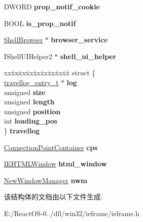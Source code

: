 \begin{DoxyCompactItemize}
D\+W\+O\+RD {\bfseries prop\+\_\+notif\+\_\+cookie}
\item 
\mbox{\label{struct_doc_host_a7151d73ed8dcb7289ea51bfe697f848d}} 
B\+O\+OL {\bfseries is\+\_\+prop\+\_\+notif}
\item 
\mbox{\label{struct_doc_host_aedd623a3c1b02c438ac7c55a15bc8395}} 
\hyperlink{struct_shell_browser}{Shell\+Browser} $\ast$ {\bfseries browser\+\_\+service}
\item 
\mbox{\label{struct_doc_host_a08bccca6d796efd84eb3bb116bff5724}} 
I\+Shell\+U\+I\+Helper2 $\ast$ {\bfseries shell\+\_\+ui\+\_\+helper}
\item 
\mbox{\label{struct_doc_host_ad0d094333246afe639caa408a834635d}} 
\begin{tabbing}
xx\=xx\=xx\=xx\=xx\=xx\=xx\=xx\=xx\=\kill
struct \{\\
\>\hyperlink{structtravellog__entry__t}{travellog\_entry\_t} $\ast$ {\bfseries log}\\
\>unsigned {\bfseries size}\\
\>unsigned {\bfseries length}\\
\>unsigned {\bfseries position}\\
\>int {\bfseries loading\_pos}\\
\} {\bfseries travellog}\\

\end{tabbing}\item 
\mbox{\label{struct_doc_host_a377b2334d1b1962d7906eeefe13851f1}} 
\hyperlink{struct_connection_point_container}{Connection\+Point\+Container} {\bfseries cps}
\item 
\mbox{\label{struct_doc_host_a06aaf3e641fc908fff061bbb1daf79f3}} 
\hyperlink{struct_i_e_h_t_m_l_window}{I\+E\+H\+T\+M\+L\+Window} {\bfseries html\+\_\+window}
\item 
\mbox{\label{struct_doc_host_a67cdb7fc9498e85a8299d6cd4cacfcfe}} 
\hyperlink{struct_new_window_manager}{New\+Window\+Manager} {\bfseries nwm}
\end{DoxyCompactItemize}


该结构体的文档由以下文件生成\+:\begin{DoxyCompactItemize}
\item 
E\+:/\+React\+O\+S-\/0../dll/win32/ieframe/ieframe.\+h\end{DoxyCompactItemize}
